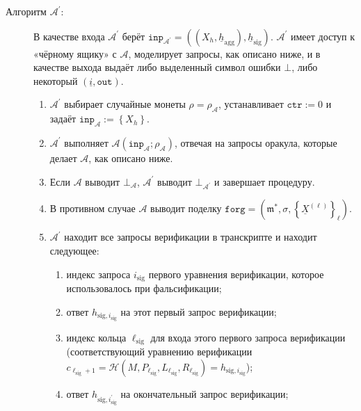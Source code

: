 \documentclass{mrl}
\theoremstyle{definition}
\numberwithin{theorem}{subsection}
\newcommand{\adversary}{\mathcal{A}}
\newcommand{\m}{\mathfrak{m}}
\begin{document}
\begin{description}
\item [Алгоритм $\adversary^\prime$:] В качестве входа $\adversary^\prime$ берёт $\texttt{inp}_{\adversary^\prime} = ((X_h, \underline{h}_{\text{agg}}), \underline{h}_{\text{sig}})$. $\adversary^\prime$ имеет доступ к «чёрному ящику» с $\adversary$, моделирует запросы, как описано ниже, и в качестве выхода выдаёт либо выделенный символ ошибки $\bot$, либо некоторый $(\underline{i}, \texttt{out})$.

\begin{enumerate}
\item $\adversary^\prime$ выбирает случайные монеты $\rho = \rho_\adversary$, устанавливает $\texttt{ctr}:=0$ и задаёт $\texttt{inp}_\adversary := \left\{X_h\right\}$.

\item $\adversary^\prime$ выполняет $\adversary(\texttt{inp}_\adversary; \rho_\adversary)$, отвечая на запросы оракула, которые делает $\adversary$, как описано ниже.

\item Если $\adversary$ выводит $\bot_\adversary$, $\adversary^\prime$ выводит $\bot_{\adversary^\prime}$ и завершает процедуру.

\item В противном случае $\adversary$ выводит поделку $\texttt{forg} = (\m^*, \sigma, \left\{\underline{X}^{(\ell)}\right\}_{\ell})$.

\item $\adversary^\prime$ находит все запросы верификации в транскрипте и находит следующее:

\begin{enumerate}
\item индекс запроса $i_{\text{sig}}$ первого уравнения верификации, которое использовалось при фальсификации;

\item ответ $h_{\text{sig},i_{\text{sig}}}$ на этот первый запрос верификации;

\item индекс кольца $\ell_{\text{sig}}$ для входа этого первого запроса верификации (соответствующий уравнению верификации $c_{\ell_{\text{sig}}+1} = \mathcal{H}(M, P_{\ell_{\text{sig}}}, L_{\ell_{\text{sig}}}, R_{\ell_{\text{sig}}}) = h_{\text{sig}, i_{\text{sig}}}$);

\item ответ $h_{\text{sig}, i_{\text{sig}}^\prime}$ на окончательный запрос верификации;


\end{enumerate}
\end{enumerate}
\end{description}
\end{document}
